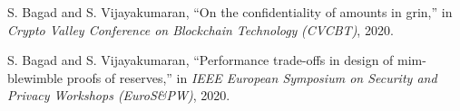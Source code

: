 \listofpublications



\begin{enumerate}[label={[\arabic*]}, leftmargin=\parindent, align=left, labelwidth=\parindent,labelsep=0pt]
    \item S. Bagad and S. Vijayakumaran, ``On the confidentiality of amounts in grin,'' in \textit{Crypto Valley Conference on Blockchain Technology} \textit{(CVCBT)}, 2020.
    \item S. Bagad and S. Vijayakumaran, ``Performance trade-offs in design of mim-blewimble proofs of reserves,'' in \textit{IEEE European Symposium on Security and Privacy Workshops (EuroS\&PW)}, 2020.
\end{enumerate}
















